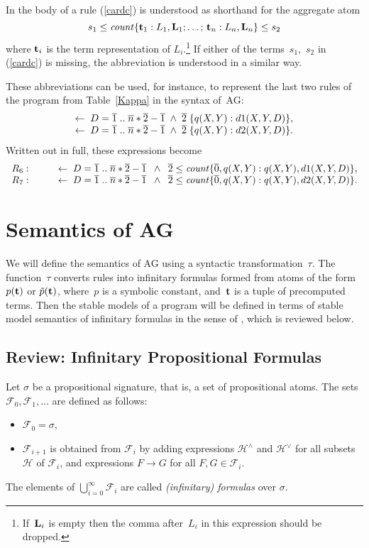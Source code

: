 \documentclass{tlp}
\def\ar{\leftarrow}
\def\rar{\rightarrow}
\def\ba{\begin{array}}
\def\ea{\end{array}}
\begin{document}
In the body of a rule (\ref{cardc}) is understood as shorthand for the
aggregate atom $$s_1\leq{\it count}\{{\bf t}_1:L_1,{\bf L}_1;\ldots;\,
{\bf t}_n :L_n, {\bf L}_n\}\leq s_2$$
where ${\bf t}_i$ is the term representation of $L_i$.\footnote{If~${\bf L}_i$
is empty then the comma after~$L_i$ in this expression should be dropped.} If
either of the terms~$s_1$,~$s_2$ in (\ref{cardc}) is missing, the
abbreviation is understood in a similar way.

These abbreviations can be used, for instance, to represent the last two
rules of the program from Table~\ref{Kappa} in the syntax of~AG:
$$\ba l
\ar \; D = \overline 1\;..\;\overline n*\overline 2-\overline 1 \; \land \;\overline 2 \; \{ q(X,Y)
: d1(X,Y,D) \},\\
\ar \; D = \overline 1\;..\;\overline n*\overline 2-\overline 1 \; \land \;\overline 2 \; \{ q(X,Y)
: d2(X,Y,D) \}.
\ea
$$
Written out in full, these expressions become
$$
\ba{ll}
R_6: \qquad  & \ar \; D = \overline 1\;..\;\overline n*\overline 2-\overline 1
\;\; \land \;\; \overline 2 \leq {\it count}\{ \overline 0, q(X,Y)
:q(X,Y), d1(X,Y,D) \},\\
R_7: \qquad  & \ar \; D = \overline 1\;..\;\overline n*\overline 2-\overline 1
\;\; \land \;\; \overline 2 \leq {\it count}\{ \overline 0,q(X,Y)
:q(X,Y), d2(X,Y,D) \}.
\ea
$$

\section{Semantics of AG} \label{sec:semantics}

We will define the semantics of AG using a syntactic
transformation~$\tau$.  The function~$\tau$ converts rules
into infinitary formulas formed from atoms
of the form $p({\bf t})$ or $\tilde{p}({\bf t})$, where~$p$ is a symbolic
constant, and~${\bf t}$ is a tuple
of precomputed terms.  Then the stable models of a program
will be defined in terms of stable model semantics of infinitary formulas
in the sense of  \citeyear{tru12}, which is reviewed below.

\subsection{Review: Infinitary Propositional Formulas}\label{sem:inf}

Let $\sigma$ be a propositional signature,
that is, a set of propositional atoms.  The sets
\hbox{$\mathcal{F}_0,\mathcal{F}_1,\ldots$} are defined as follows:
\begin{itemize}
\item $\mathcal{F}_0=\sigma$,
\item $\mathcal{F}_{i+1}$ is obtained from $\mathcal{F}_{i}$ by
adding expressions $\mathcal{H}^\land$ and $\mathcal{H}^\lor$ for all subsets
$\mathcal{H}$ of $\mathcal{F}_i$, and expressions \hbox{$F\rar G$}
for all $F,G\in\mathcal{F}_i$.
\end{itemize}
The elements of $\bigcup^{\infty}_{i=0}\mathcal{F}_i$ are called {\sl
(infinitary) formulas} over $\sigma$.
\end{document}
